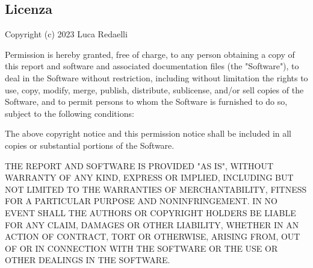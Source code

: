 \documentclass{article}
\begin{document}
\subsection{Licenza}
Copyright (c) 2023 Luca Redaelli

Permission is hereby granted, free of charge, to any person obtaining a copy of this report and software and associated documentation files (the "Software"), to deal in the Software without restriction, including without limitation the rights to use, copy, modify, merge, publish, distribute, sublicense, and/or sell copies of the Software, and to permit persons to whom the Software is furnished to do so, subject to the following conditions:

\bigskip

The above copyright notice and this permission notice shall be included in all copies or substantial portions of the Software.

\bigskip

THE REPORT AND SOFTWARE IS PROVIDED "AS IS", WITHOUT WARRANTY OF ANY KIND, EXPRESS OR IMPLIED, INCLUDING BUT NOT LIMITED TO THE WARRANTIES OF MERCHANTABILITY, FITNESS FOR A PARTICULAR PURPOSE AND NONINFRINGEMENT. IN NO EVENT SHALL THE AUTHORS OR COPYRIGHT HOLDERS BE LIABLE FOR ANY CLAIM, DAMAGES OR OTHER LIABILITY, WHETHER IN AN ACTION OF CONTRACT, TORT OR OTHERWISE, ARISING FROM, OUT OF OR IN CONNECTION WITH THE SOFTWARE OR THE USE OR OTHER DEALINGS IN THE SOFTWARE.
\end{document}
